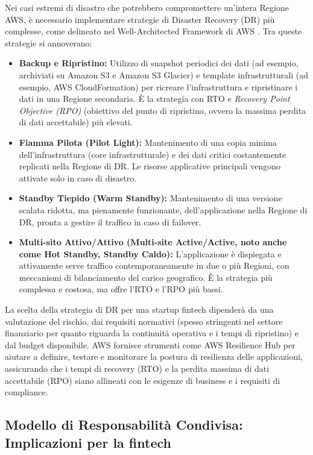 Nei casi estremi di disastro che potrebbero compromettere un'intera Regione AWS, è necessario implementare strategie di Disaster Recovery (DR) più complesse, come delineato nel Well-Architected Framework di AWS \cite{awsWellArchitected}. Tra queste strategie si annoverano:
\begin{itemize}
    \item \textbf{Backup e Ripristino:} Utilizzo di snapshot periodici dei dati (ad esempio, archiviati su Amazon S3 e Amazon S3 Glacier) e template infrastrutturali (ad esempio, AWS CloudFormation) per ricreare l'infrastruttura e ripristinare i dati in una Regione secondaria. È la strategia con RTO e \textit{Recovery Point Objective (RPO)} (obiettivo del punto di ripristino, ovvero la massima perdita di dati accettabile) più elevati.
    \item \textbf{Fiamma Pilota (Pilot Light):} Mantenimento di una copia minima dell'infrastruttura (core infrastrutturale) e dei dati critici costantemente replicati nella Regione di DR. Le risorse applicative principali vengono attivate solo in caso di disastro.
    \item \textbf{Standby Tiepido (Warm Standby):} Mantenimento di una versione scalata ridotta, ma pienamente funzionante, dell'applicazione nella Regione di DR, pronta a gestire il traffico in caso di failover.
    \item \textbf{Multi-sito Attivo/Attivo (Multi-site Active/Active, noto anche come Hot Standby, Standby Caldo):} L'applicazione è dispiegata e attivamente serve traffico contemporaneamente in due o più Regioni, con meccanismi di bilanciamento del carico geografico. È la strategia più complessa e costosa, ma offre l'RTO e l'RPO più bassi.
\end{itemize}
La scelta della strategia di DR per una startup fintech dipenderà da una valutazione del rischio, dai requisiti normativi (spesso stringenti nel settore finanziario per quanto riguarda la continuità operativa e i tempi di ripristino) e dal budget disponibile. AWS fornisce strumenti come AWS Resilience Hub \cite{aws-resilience} per aiutare a definire, testare e monitorare la postura di resilienza delle applicazioni, assicurando che i tempi di recovery (RTO) e la perdita massima di dati accettabile (RPO) siano allineati con le esigenze di business e i requisiti di compliance.

\subsection{Modello di Responsabilità Condivisa: Implicazioni per la fintech}
\label{sec:shared-responsibility-fintech}


